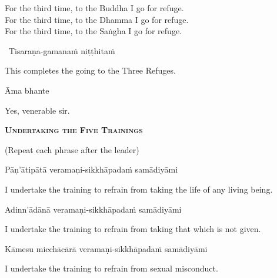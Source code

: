 \begin{english-verses}
  For the third time, to the Buddha I go for refuge.\\
  For the third time, to the Dhamma I go for refuge.\\
  For the third time, to the Saṅgha I go for refuge.
\end{english-verses}

\begin{leader-only}
  \anglebracketleft\ \hspace{-0.5mm}Tisaraṇa-gamanaṁ niṭṭhitaṁ \hspace{-0.5mm}\anglebracketright\
\end{leader-only}

\begin{english}
  This completes the going to the Three Refuges.
\end{english}

Āma bhante

\begin{english}
  Yes, venerable sir.
\end{english}

\clearpage

\begin{center}
  \textbf{\textsc{Undertaking the Five Trainings}}
\end{center}

\begin{center}
  (Repeat each phrase after the leader)
\end{center}

Pāṇ'ātipātā veramaṇi-sikkhāpadaṁ samādiyāmi

\begin{english-hang}
  I undertake the training\makeatletter\hyperlink{endnote139-appendix}\makeatother
  to refrain from taking the life of any living being.
\end{english-hang}

Adinn'ādānā veramaṇi-sikkhāpadaṁ samādiyāmi

\begin{english}
  I undertake the training to refrain from taking that which is not given.
\end{english}

Kāmesu micchācārā veramaṇi-sikkhāpadaṁ samādiyāmi

\begin{english}
  I undertake the training to refrain from sexual misconduct.
\end{english}

